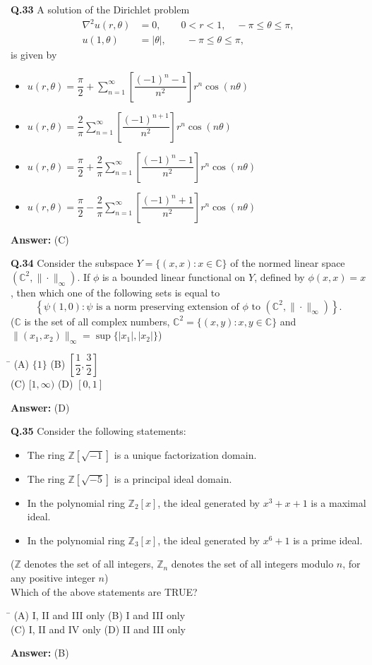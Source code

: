 \documentclass[11pt,a4paper]{article}
\newcommand{\optsfourA}[4]{%
  \begin{tabbing}
    \hspace{0.48\linewidth}\=\kill
    (A) #1 \> (B) #2 \\[2pt]
    (C) #3 \> (D) #4
  \end{tabbing}%
}
\newcommand{\optslistA}[4]{%
  \begin{itemize}
    \setlength{\itemsep}{2pt}\setlength{\parskip}{0pt}
    \item[(A)] #1
    \item[(B)] #2
    \item[(C)] #3
    \item[(D)] #4
  \end{itemize}%
}
\newcommand{\ans}[1]{\textbf{Answer:} #1\par\medskip}
\begin{document}
\textbf{Q.33} A solution of the Dirichlet problem
\begin{align*}
  \nabla^2 u(r, \theta) &= 0, \qquad 0 < r < 1,\quad -\pi \le \theta \le \pi, \\
  u(1, \theta) &= |\theta|, \qquad -\pi \le \theta \le \pi,
\end{align*}
is given by
\optslistA{$u(r, \theta) = \dfrac{\pi}{2} + \displaystyle\sum_{n=1}^{\infty} \left[\dfrac{(-1)^n - 1}{n^2}\right] r^n \cos(n\theta)$}{$u(r, \theta) = \dfrac{2}{\pi} \displaystyle\sum_{n=1}^{\infty} \left[\dfrac{(-1)^{n+1}}{n^2}\right] r^n \cos(n\theta)$}{$u(r, \theta) = \dfrac{\pi}{2} + \dfrac{2}{\pi} \displaystyle\sum_{n=1}^{\infty} \left[\dfrac{(-1)^n - 1}{n^2}\right] r^n \cos(n\theta)$}{$u(r, \theta) = \dfrac{\pi}{2} - \dfrac{2}{\pi} \displaystyle\sum_{n=1}^{\infty} \left[\dfrac{(-1)^n + 1}{n^2}\right] r^n \cos(n\theta)$}
\ans{(C)}

\textbf{Q.34} Consider the subspace $Y = \{(x, x) : x \in \mathbb{C}\}$ of the normed linear space $(\mathbb{C}^2, \|\cdot\|_\infty)$. If $\phi$ is a bounded linear functional on $Y$, defined by $\phi(x, x) = x$, then which one of the following sets is equal to
\[
  \left\{\psi(1, 0) : \psi \text{ is a norm preserving extension of } \phi \text{ to } (\mathbb{C}^2, \|\cdot\|_\infty)\right\}.
\]
($\mathbb{C}$ is the set of all complex numbers, $\mathbb{C}^2 = \{(x, y) : x, y \in \mathbb{C}\}$ and $\|(x_1, x_2)\|_\infty = \sup\{|x_1|, |x_2|\}$)
\optsfourA{$\{1\}$}{$\left[\dfrac{1}{2}, \dfrac{3}{2}\right]$}{$[1, \infty)$}{$[0, 1]$}
\ans{(D)}

\textbf{Q.35} Consider the following statements:
\begin{itemize}
  \setlength{\itemsep}{1pt}\setlength{\parskip}{0pt}
  \item[I.] The ring $\mathbb{Z}[\sqrt{-1}]$ is a unique factorization domain.
  \item[II.] The ring $\mathbb{Z}[\sqrt{-5}]$ is a principal ideal domain.
  \item[III.] In the polynomial ring $\mathbb{Z}_2[x]$, the ideal generated by $x^3 + x + 1$ is a maximal ideal.
  \item[IV.] In the polynomial ring $\mathbb{Z}_3[x]$, the ideal generated by $x^6 + 1$ is a prime ideal.
\end{itemize}
($\mathbb{Z}$ denotes the set of all integers, $\mathbb{Z}_n$ denotes the set of all integers modulo $n$, for any positive integer $n$)\\
Which of the above statements are TRUE?
\optsfourA{I, II and III only}{I and III only}{I, II and IV only}{II and III only}
\ans{(B)}
\end{document}
